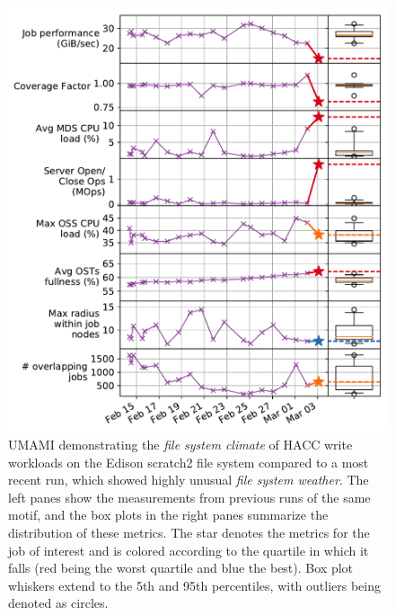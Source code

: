 \begin{figure}[t]
    \centering
    \includegraphics[width=1.0\columnwidth]{figs/umami-scratch2-hacc-write.pdf}
    \caption{UMAMI demonstrating the \emph{file system climate} of HACC write workloads on the Edison scratch2 file system compared to a most recent run, which showed highly unusual \emph{file system weather}.
    The left panes show the measurements from previous runs of the same motif, and the box plots in the right panes summarize the distribution of these metrics.
    The star denotes the metrics for the job of interest and is colored according to the quartile in which it falls (red being the worst quartile and blue the best).
    Box plot whiskers extend to the 5th and 95th percentiles, with outliers being denoted as circles.}
    \label{fig:umami-scratch2-hacc-write}
\vspace{-.2in}
\end{figure}


